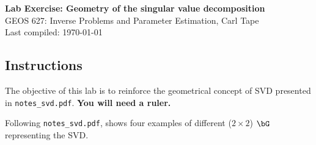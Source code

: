 \documentclass[11pt,titlepage,fleqn]{article}
\begin{document}

\begin{spacing}{1.2}
\centering
{\large \bf Lab Exercise: Geometry of the singular value decomposition} \\
GEOS 627: Inverse Problems and Parameter Estimation, Carl Tape \\
Last compiled: \today
\end{spacing}


\subsection*{Instructions}

The objective of this lab is to reinforce the geometrical concept of SVD \citep{TrefethenBau} presented in \verb+notes_svd.pdf+. {\bf You will need a ruler.}

Following \verb+notes_svd.pdf+,  shows four examples of different ($2 \times 2$) $\bG$ representing the SVD.
\end{document}

